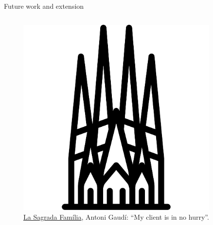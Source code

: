 \documentclass{beamer}
\theoremstyle{definition}
\begin{document}
\begin{frame}[shrink=15]{Future work and extension}
\begin{columns}
\begin{column}{0.3\textwidth}
    \begin{figure}
    \centering
        \includegraphics[width=0.9\textwidth]{img/logos/SagradaFamilia.pdf}
        \caption{\small \centering  \href{https://boutique.arte.tv/detail/sagrada-familia-le-defi-de-gaudi}{La Sagrada Família}, Antoni Gaudí: ``My client is in no hurry''.}
    \end{figure}
\end{column}
        

\end{columns}

\end{frame}
\end{document}
